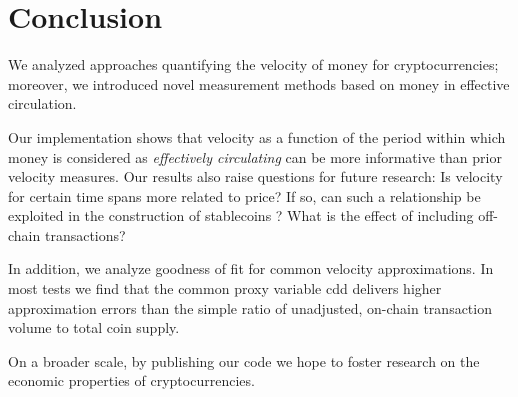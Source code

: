 \section{Conclusion}
\label{sec:concl}%


We analyzed approaches quantifying the velocity of money for
cryptocurrencies; moreover, we introduced novel measurement methods based on
money in effective circulation.  %

Our implementation shows that velocity as a function of the period within
which money is considered as \emph{effectively circulating} can be more
informative than prior velocity measures.  Our results also raise questions
for future research: Is velocity for certain time spans more related to
price?  If so, can such a relationship be exploited in the construction of
stablecoins \citep[cf.][]{perniceetal2019stabil}?  What is the effect of
including off-chain transactions?  %

In addition, we analyze goodness of fit for common velocity
approximations.  %
In most tests we find that the common proxy variable \acl{cdd} delivers
higher approximation errors than the simple ratio of unadjusted, on-chain
transaction volume to total coin supply.  %

On a broader scale, by publishing our code we hope to foster research on the
economic properties of cryptocurrencies. %

